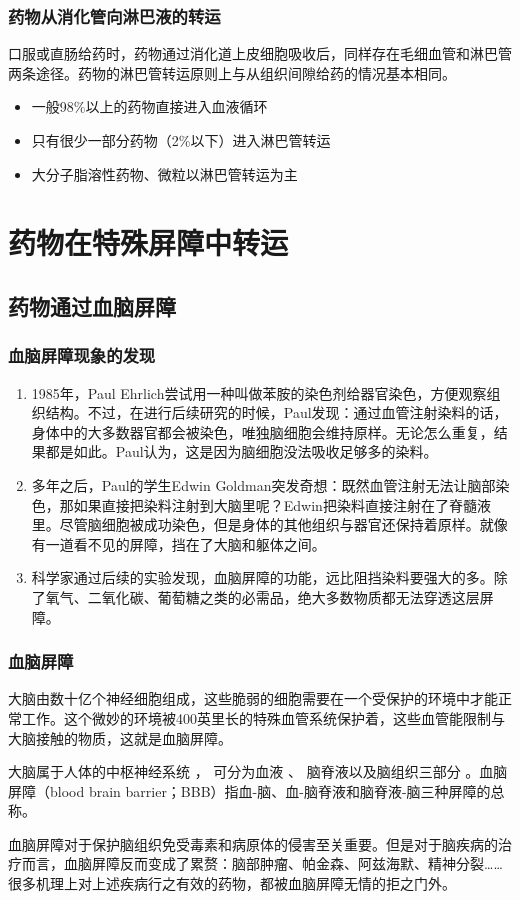 \documentclass[dvipsnames, svgnames, x11names]{beamer}
\begin{document}
\begin{frame}
    \frametitle{药物从消化管向淋巴液的转运}
    口服或直肠给药时，药物通过消化道上皮细胞吸收后，同样存在毛细血管和淋巴管两条途径。药物的淋巴管转运原则上与从组织间隙给药的情况基本相同。

    \begin{itemize}
      \item 一般98\%以上的药物直接进入血液循环
      \item 只有很少一部分药物（2\%以下）进入淋巴管转运
      \item 大分子脂溶性药物、微粒以淋巴管转运为主
    \end{itemize}
\end{frame}


\section{药物在特殊屏障中转运}


\subsection{药物通过血脑屏障}


\begin{frame}
    \frametitle{血脑屏障现象的发现}
    \begin{enumerate}
      \item 1985年，Paul Ehrlich尝试用一种叫做苯胺的染色剂给器官染色，方便观察组织结构。不过，在进行后续研究的时候，Paul发现：通过血管注射染料的话，身体中的大多数器官都会被染色，唯独脑细胞会维持原样。无论怎么重复，结果都是如此。Paul认为，这是因为脑细胞没法吸收足够多的染料。
      \item 多年之后，Paul的学生Edwin Goldman突发奇想：既然血管注射无法让脑部染色，那如果直接把染料注射到大脑里呢？Edwin把染料直接注射在了脊髓液里。尽管脑细胞被成功染色，但是身体的其他组织与器官还保持着原样。就像有一道看不见的屏障，挡在了大脑和躯体之间。
      \item 科学家通过后续的实验发现，血脑屏障的功能，远比阻挡染料要强大的多。除了氧气、二氧化碳、葡萄糖之类的必需品，绝大多数物质都无法穿透这层屏障。
    \end{enumerate}
\end{frame}


\begin{frame}
    \frametitle{血脑屏障}
    大脑由数十亿个神经细胞组成，这些脆弱的细胞需要在一个受保护的环境中才能正常工作。这个微妙的环境被400英里长的特殊血管系统保护着，这些血管能限制与大脑接触的物质，这就是血脑屏障。

    大脑属于人体的中枢神经系统 ， 可分为血液 、 脑脊液以及脑组织三部分 。血脑屏障（blood brain barrier；BBB）指血-脑、血-脑脊液和脑脊液-脑三种屏障的总称。

    血脑屏障对于保护脑组织免受毒素和病原体的侵害至关重要。但是对于脑疾病的治疗而言，血脑屏障反而变成了累赘：脑部肿瘤、帕金森、阿兹海默、精神分裂……很多机理上对上述疾病行之有效的药物，都被血脑屏障无情的拒之门外。
\end{frame}
\end{document}
